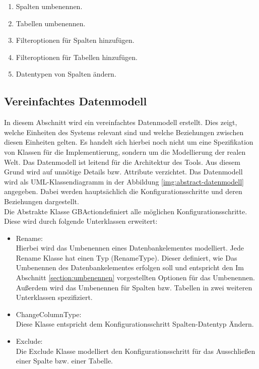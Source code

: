 \begin{enumerate}
	\item Spalten  umbenennen.
	\item Tabellen umbenennen.
	\item Filteroptionen für Spalten hinzufügen.
	\item Filteroptionen für Tabellen hinzufügen.
	\item Datentypen von Spalten ändern.
\end{enumerate}





\subsection{Vereinfachtes Datenmodell}
In diesem Abschnitt wird ein vereinfachtes Datenmodell erstellt. Dies zeigt, welche Einheiten des Systems relevant sind und welche Beziehungen zwischen diesen Einheiten gelten. Es handelt sich hierbei noch nicht um eine Spezifikation von Klassen für die Implementierung, sondern um
die Modellierung der realen Welt. Das Datenmodell ist leitend für die Architektur des Tools. Aus diesem Grund wird auf unnötige Details bzw. Attribute verzichtet.
Das Datenmodell wird als UML-Klassendiagramm in der Abbildung \ref{img:abstract-datenmodell} angegeben. Dabei werden hauptsächlich die Konfigurationsschritte und deren Beziehungen dargestellt. \\
Die Abstrakte Klasse \glqq GBAction\grqq definiert alle möglichen Konfigurationsschritte. Diese wird durch folgende Unterklassen erweitert:
\begin{itemize}
	\item Rename: \\
	Hierbei wird das Umbenennen eines Datenbankelementes modelliert. Jede Rename Klasse hat einen Typ (RenameType). Dieser definiert, wie Das Umbenennen des Datenbankelementes erfolgen soll und entspricht den Im Abschnitt \ref{section:umbenennen} vorgestellten Optionen für das Umbenennen. Außerdem wird das Umbenennen für Spalten bzw. Tabellen in zwei weiteren Unterklassen spezifiziert.
	\item ChangeColumnType: \\
	Diese Klasse entspricht dem Konfigurationsschritt \glqq Spalten-Datentyp Ändern\grqq.  
	\item Exclude: \\
	Die Exclude Klasse modelliert den Konfigurationsschritt für das Ausschließen einer Spalte bzw. einer Tabelle.
	\end{itemize}
